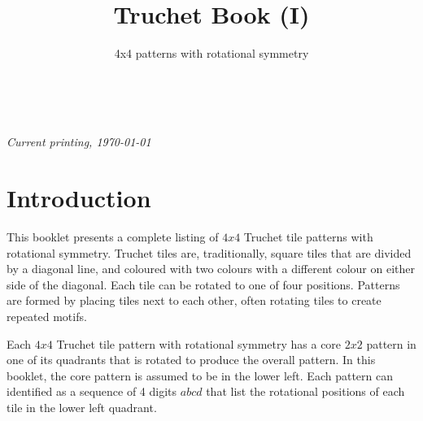 \documentclass{tufte-book}
\title{Truchet Book (I)}
\subtitle{4x4 patterns with rotational symmetry}
\author[]{}
\begin{document}



\maketitle


\newpage
\begin{fullwidth}
~\vfill
\thispagestyle{empty}
\setlength{\parindent}{0pt}
\setlength{\parskip}{\baselineskip}



\par\textit{Current printing, \today}
\end{fullwidth}




\cleardoublepage



\chapter*{Introduction}

This booklet presents a complete listing of $4x4$ Truchet tile patterns with rotational symmetry.  \marginnote{\centering} Truchet tiles are, traditionally, square tiles that are divided by a diagonal line, and coloured with two colours with a different colour on either side of the diagonal. Each tile can be rotated to one of four positions. Patterns are formed by placing tiles next to each other, often rotating tiles to create repeated motifs.

\vspace{0.5cm}
\noindent
Each $4x4$
Truchet tile pattern with rotational symmetry has a core $2x2$ pattern in one of its quadrants that is rotated to produce the overall pattern. \marginnote{\centering} In this booklet, the core pattern is assumed to be in the lower left. Each pattern can identified as a sequence of 4 digits $abcd$ that list the rotational positions of each tile in the lower left quadrant.
\end{document}
